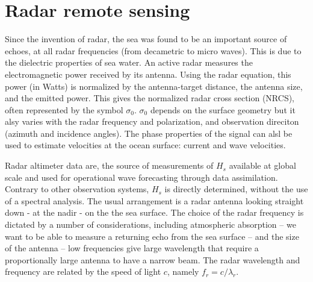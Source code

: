 
 \section{Radar remote sensing}
Since the invention of radar, the sea was found to be an important source of echoes, at all radar frequencies (from decametric to micro waves). 
This is due to the dielectric properties of sea water. An active radar measures the electromagnetic power received by its antenna. Using the radar equation, this power (in Watts)
is normalized by the antenna-target distance, the antenna size, and the emitted power. This gives the normalized radar cross section (NRCS), often represented 
by the symbol $\sigma_0$. 
$\sigma_0$ depends on the surface geometry but it alsy varies with the radar frequency and polarization,  and observation direciton (azimuth and incidence angles). %
The phase properties of the signal can alsl be used to estimate velocities at the ocean surface: current and wave velocities. 



Radar altimeter data are, the source of measurements of $H_s$  available at global scale and used for operational wave forecasting
through data assimilation. Contrary to other observation systems, $H_s$ is directly determined, without the use of a spectral analysis. The usual 
arrangement is a radar antenna looking straight down - at the nadir - on the the sea surface. The choice of the radar frequency is dictated by 
a number of considerations, including atmospheric absorption -- we want to be able to measure a returning echo from the sea surface -- and the 
size of the antenna -- low frequencies give large wavelength that require a proportionally large antenna to have a narrow beam. The radar wavelength 
and frequency are related by the speed of light $c$, namely $f_r = c / \lambda_r$.

